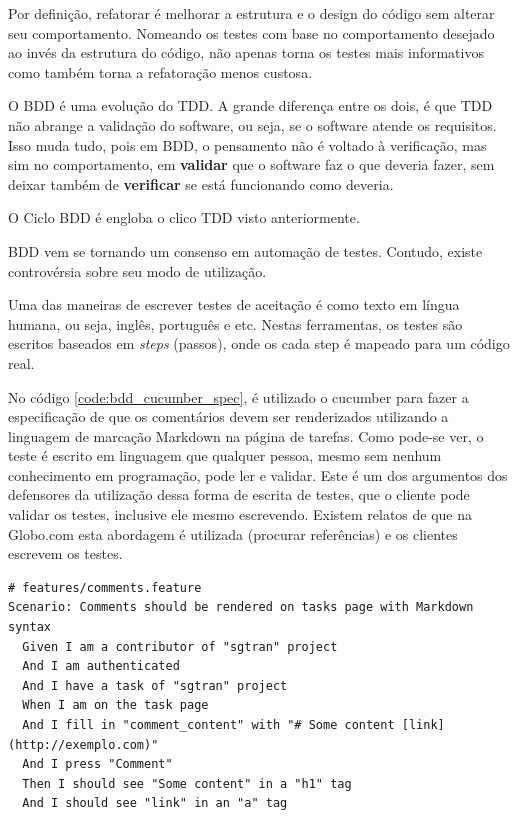 Por definição, refatorar é melhorar a estrutura e o design do código sem alterar seu comportamento. Nomeando os testes com base no comportamento desejado ao invés da estrutura do código, não apenas torna os testes mais informativos como também torna a refatoração menos custosa.

O BDD é uma evolução do TDD. A grande diferença entre os dois, é que TDD não abrange a validação do software, ou seja, se o software atende os requisitos. Isso muda tudo, pois em BDD, o pensamento não é voltado à verificação, mas sim no comportamento, em \textbf{validar} que o software faz o que deveria fazer, sem deixar também de \textbf{verificar} se está funcionando como deveria.

O Ciclo BDD é engloba o clico TDD visto anteriormente.

BDD vem se tornando um consenso em automação de testes. Contudo, existe controvérsia sobre seu modo de utilização.

Uma das maneiras de escrever testes de aceitação é como texto em língua humana,
ou seja, inglês, português e etc. Nestas ferramentas, os testes são escritos baseados em \textit{steps} (passos), onde os cada step é mapeado para um código real.

No código \ref{code:bdd_cucumber_spec}, é utilizado o cucumber para fazer a especificação de que os comentários devem ser renderizados utilizando a linguagem de marcação Markdown na página de tarefas. Como pode-se ver, o teste é escrito em linguagem que qualquer pessoa, mesmo sem nenhum conhecimento em programação, pode ler e validar. Este é um dos argumentos dos defensores da utilização dessa forma de escrita de testes, que o cliente pode validar os testes, inclusive ele mesmo escrevendo. Existem relatos de que na Globo.com esta abordagem é utilizada (procurar referências) e os clientes escrevem os testes.

\begin{lstlisting}[caption=Especificação ,label=code:bdd_cucumber_spec]
# features/comments.feature
Scenario: Comments should be rendered on tasks page with Markdown syntax
  Given I am a contributor of "sgtran" project
  And I am authenticated
  And I have a task of "sgtran" project
  When I am on the task page
  And I fill in "comment_content" with "# Some content [link](http://exemplo.com)"
  And I press "Comment"
  Then I should see "Some content" in a "h1" tag
  And I should see "link" in an "a" tag
\end{lstlisting}


